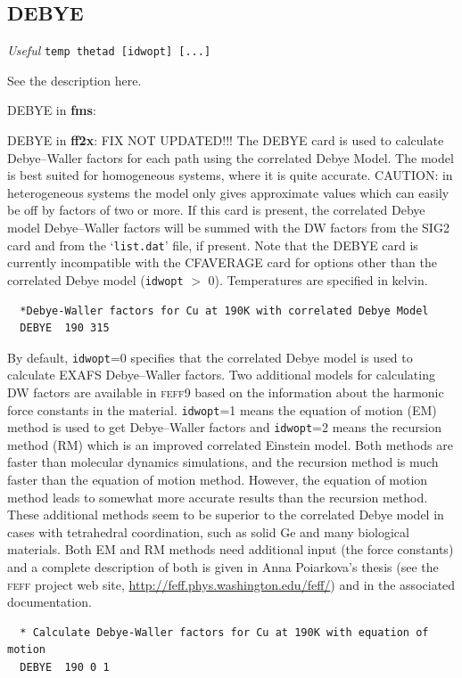 \documentclass[11pt,oneside]{report} %
\renewcommand{\htmladdnormallink}[2]{\href{#2}{#1}}
\renewcommand{\htmlref}[2]{\hyperlink{#2}{#1}}
\newcommand{\program}[1]{\textsc{#1}}
\newcommand{\feff}{\program{feff}}
\newcommand{\vnum}{9}
\newcommand{\feffcur}{\feff\vnum}
\newenvironment{Card}[4]%
      {\vspace{3ex}%
        \subsection{#1}
        \quad\textsl{#3}\newline
        \quad\texttt{#2}\newline%
        \label{card:#4}\\}
      {}
\newcommand{\file}[1]{`\texttt{#1}'}
\newcommand{\module}[1]{\textrm{\bf{#1}}}
\renewcommand{\htmlref}[2]{{#1}} %
\begin{document}
\begin{Card}{DEBYE}{temp thetad [idwopt] [...]}{Useful}{deb1}
\begin{latexonly}
  See the description \htmlref{here}{car:deb2}.
\end{latexonly}
 \begin{htmlonly}
  {\large DEBYE in \module{fms}:}\newline
 \end{htmlonly}  

 \begin{htmlonly}
  {\large DEBYE in \module{ff2x}:}\newline
 FIX  NOT UPDATED!!!
  The DEBYE card is used to calculate Debye--Waller factors for each
  path using the correlated Debye Model. The model is best suited for
  homogeneous systems, where it is quite accurate. CAUTION: in
  heterogeneous systems the model only gives approximate values which
  can easily be off by factors of two or more. If this card is present, 
  the correlated Debye model Debye--Waller factors will be summed with the 
  DW factors from the \htmlref{SIG2}{card:sig} card and from the \file{list.dat} 
  file, if present. Note that the DEBYE card is currently incompatible with the 
  \htmlref{CFAVERAGE}{card:cfa} card for options other than the correlated Debye 
  model (\texttt{idwopt} $>$ 0). Temperatures are specified in kelvin.

\begin{verbatim}
  *Debye-Waller factors for Cu at 190K with correlated Debye Model
  DEBYE  190 315
\end{verbatim}

  By default, \texttt{idwopt}=0 specifies that the correlated Debye model 
  is used to calculate EXAFS Debye--Waller factors. Two additional models for
  calculating DW factors are available in {\feffcur} based on the information
  about the harmonic force constants in the material. \texttt{idwopt}=1
  means the equation of motion (EM) method is used to get Debye--Waller
  factors and \texttt{idwopt}=2 means the recursion method (RM) which
  is an improved correlated Einstein model. Both methods are faster than 
  molecular dynamics simulations, and the recursion method is much faster 
  than the equation of motion method. However, the equation of motion method 
  leads to somewhat more accurate results than the recursion method. These 
  additional methods seem to be superior to the correlated Debye model in cases 
  with tetrahedral coordination, such as solid Ge and many biological materials. 
  Both EM and RM methods need additional input (the force constants) and a 
  complete description of both is given in Anna Poiarkova's thesis (see the 
  {\feff} project web site, \htmladdnormallink{http://feff.phys.washington.edu/feff/}{http://feff.phys.washington.edu/feff/Docs/Docs.html}) 
  and in the associated documentation.

\begin{verbatim}
  * Calculate Debye-Waller factors for Cu at 190K with equation of motion
  DEBYE  190 0 1
\end{verbatim}
 \end{htmlonly}

\end{Card}
\end{document}
